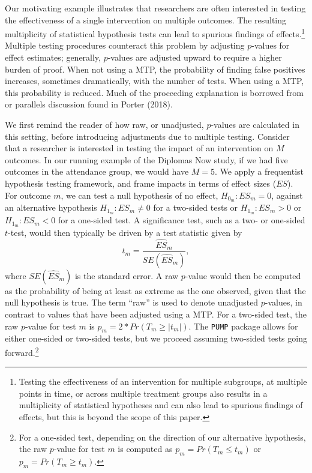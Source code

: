 \documentclass[
]{article}
\begin{document}
Our motivating example illustrates that researchers are often interested
in testing the effectiveness of a single intervention on multiple
outcomes. The resulting multiplicity of statistical hypothesis tests can
lead to spurious findings of effects.\footnote{Testing the effectiveness
  of an intervention for multiple subgroups, at multiple points in time,
  or across multiple treatment groups also results in a multiplicity of
  statistical hypotheses and can also lead to spurious findings of
  effects, but this is beyond the scope of this paper.} Multiple testing
procedures counteract this problem by adjusting \(p\)-values for effect
estimates; generally, \(p\)-values are adjusted upward to require a
higher burden of proof. When not using a MTP, the probability of finding
false positives increases, sometimes dramatically, with the number of
tests. When using a MTP, this probability is reduced. Much of the
proceeding explanation is borrowed from or parallels discussion found in
Porter (2018).

We first remind the reader of how raw, or unadjusted, \(p\)-values are
calculated in this setting, before introducing adjustments due to
multiple testing. Consider that a researcher is interested in testing
the impact of an intervention on \(M\) outcomes. In our running example
of the Diplomas Now study, if we had five outcomes in the attendance
group, we would have \(M = 5\). We apply a frequentist hypothesis
testing framework, and frame impacts in terms of effect sizes (\(ES\)).
For outcome \(m\), we can test a null hypothesis of no effect,
\(H_{0_m}: ES_m = 0\), against an alternative hypothesis
\(H_{1_m}: ES_m \neq 0\) for a two-sided tests or \(H_{1_m}: ES_m > 0\)
or \(H_{1_m}: ES_m < 0\) for a one-sided test. A significance test, such
as a two- or one-sided \(t\)-test, would then typically be driven by a
test statistic given by \begin{equation}
t_m = \frac{\widehat{ES}_m}{SE(\hat{ES}_m)},
\end{equation} where \(SE(\hat{ES}_m)\) is the standard error. A raw
\(p\)-value would then be computed as the probability of being at least
as extreme as the one observed, given that the null hypothesis is true.
The term ``raw'' is used to denote unadjusted \(p\)-values, in contrast
to values that have been adjusted using a MTP. For a two-sided test, the
raw \(p\)-value for test \(m\) is \(p_m=2*Pr(T_m \geq |t_m|)\). The
\texttt{PUMP} package allows for either one-sided or two-sided tests,
but we proceed assuming two-sided tests going forward.\footnote{For a
  one-sided test, depending on the direction of our alternative
  hypothesis, the raw \(p\)-value for test \(m\) is computed as
  \(p_m=Pr(T_m \leq t_m)\) or \(p_m=Pr(T_m \geq t_m)\).}
\end{document}
